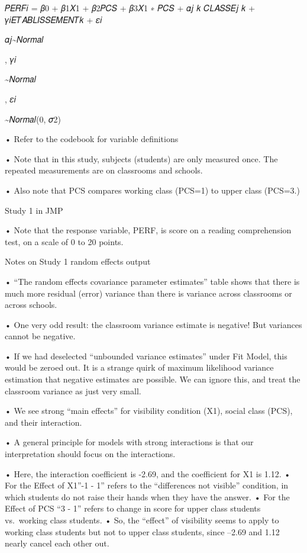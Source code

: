\documentclass[
  letterpaper,
  DIV=11,
  numbers=noendperiod]{scrreprt}
\begin{document}
𝑃𝐸𝑅𝐹𝑖 = 𝛽0 + 𝛽1𝑋1 + 𝛽2𝑃𝐶𝑆 + 𝛽3𝑋1 ∗ 𝑃𝐶𝑆 + 𝛼𝑗 𝑘 𝐶𝐿𝐴𝑆𝑆𝐸𝑗 𝑘 +
𝛾𝑖𝐸𝑇𝐴𝐵𝐿𝐼𝑆𝑆𝐸𝑀𝐸𝑁𝑇𝑘 + 𝜀𝑖

𝛼𝑗\textasciitilde 𝑁𝑜𝑟𝑚𝑎𝑙

, 𝛾𝑖

\textasciitilde 𝑁𝑜𝑟𝑚𝑎𝑙

, 𝜀𝑖

\textasciitilde 𝑁𝑜𝑟𝑚𝑎𝑙(0, 𝜎2)

• Refer to the codebook for variable definitions

• Note that in this study, subjects (students) are only measured once.
The repeated measurements are on classrooms and schools.

• Also note that PCS compares working class (PCS=1) to upper class
(PCS=3.)

Study 1 in JMP

• Note that the response variable, PERF, is score on a reading
comprehension test, on a scale of 0 to 20 points.

Notes on Study 1 random effects output

• ``The random effects covariance parameter estimates'' table shows that
there is much more residual (error) variance than there is variance
across classrooms or across schools.

• One very odd result: the classroom variance estimate is negative! But
variances cannot be negative.

• If we had deselected ``unbounded variance estimates'' under Fit Model,
this would be zeroed out. It is a strange quirk of maximum likelihood
variance estimation that negative estimates are possible. We can ignore
this, and treat the classroom variance as just very small.

• We see strong ``main effects'' for visibility condition (X1), social
class (PCS), and their interaction.

• A general principle for models with strong interactions is that our
interpretation should focus on the interactions.

• Here, the interaction coefficient is -2.69, and the coefficient for X1
is 1.12. • For the Effect of X1''-1 - 1'' refers to the ``differences
not visible'' condition, in which students do not raise their hands when
they have the answer. • For the Effect of PCS ``3 - 1'' refers to change
in score for upper class students vs.~working class students. • So, the
``effect'' of visibility seems to apply to working class students but
not to upper class students, since --2.69 and 1.12 nearly cancel each
other out.
\end{document}
